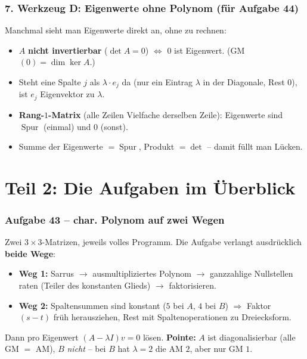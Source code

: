 \documentclass[a4paper,12pt]{article}
\begin{document}
\section*{7. Werkzeug D: Eigenwerte ohne Polynom (f\"ur Aufgabe 44)}

Manchmal sieht man Eigenwerte direkt an, ohne zu rechnen:

\begin{merkbox}[title={N\"utzliche S\"atze}]
\begin{itemize}[leftmargin=*, nosep]
    \item $A$ \textbf{nicht invertierbar} ($\det A = 0$) $\Leftrightarrow$ $0$ ist Eigenwert. (GM$(0) = \dim\ker A$.)
    \item Steht eine Spalte $j$ als $\lambda \cdot e_j$ da (nur ein Eintrag $\lambda$ in der Diagonale, Rest $0$), ist $e_j$ Eigenvektor zu $\lambda$.
    \item \textbf{Rang-$1$-Matrix} (alle Zeilen Vielfache derselben Zeile): Eigenwerte sind $\operatorname{Spur}$ (einmal) und $0$ (sonst).
    \item Summe der Eigenwerte $= \operatorname{Spur}$, Produkt $= \det$ -- damit f\"ullt man L\"ucken.
\end{itemize}
\end{merkbox}

\newpage

\part*{Teil 2: Die Aufgaben im \"Uberblick}

\section*{Aufgabe 43 -- char. Polynom auf zwei Wegen}

Zwei $3\times3$-Matrizen, jeweils volles Programm. Die Aufgabe verlangt ausdr\"ucklich \textbf{beide Wege}:
\begin{itemize}[leftmargin=*, nosep]
    \item \textbf{Weg 1:} Sarrus $\to$ ausmultipliziertes Polynom $\to$ ganzzahlige Nullstellen raten (Teiler des konstanten Glieds) $\to$ faktorisieren.
    \item \textbf{Weg 2:} Spaltensummen sind konstant ($5$ bei $A$, $4$ bei $B$) $\Rightarrow$ Faktor $(s-t)$ fr\"uh herausziehen, Rest mit Spaltenoperationen zu Dreiecksform.
\end{itemize}
Dann pro Eigenwert $(A - \lambda I)v = 0$ l\"osen. \textbf{Pointe:} $A$ ist diagonalisierbar (alle GM $=$ AM), $B$ \emph{nicht} -- bei $B$ hat $\lambda = 2$ die AM $2$, aber nur GM $1$.
\end{document}
